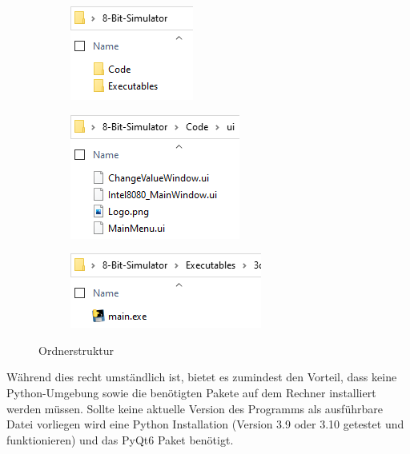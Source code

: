 \documentclass[12pt]{article}
\begin{document}
\begin{figure}[h]
\centering
\begin{subfigure}{.25\textwidth}
  \centering
  \includegraphics[width=.7\linewidth]{bilder/o1}
\end{subfigure}%
\begin{subfigure}{.35\textwidth}
  \centering
  \includegraphics[width=.7\linewidth]{bilder/o2}
\end{subfigure}
\begin{subfigure}{.35\textwidth}
  \centering
  \includegraphics[width=.7\linewidth]{bilder/o3}
\end{subfigure}
\caption{Ordnerstruktur}
\label{fig:OrdnerStruk}
\end{figure}

\noindent
Während dies recht umständlich ist, bietet es zumindest den Vorteil, dass keine Python-Umgebung sowie die benötigten Pakete auf dem Rechner installiert werden müssen. Sollte keine aktuelle Version des Programms als ausführbare Datei vorliegen wird eine Python Installation (Version 3.9 oder 3.10 getestet und funktionieren) und das PyQt6 Paket benötigt.
\end{document}
